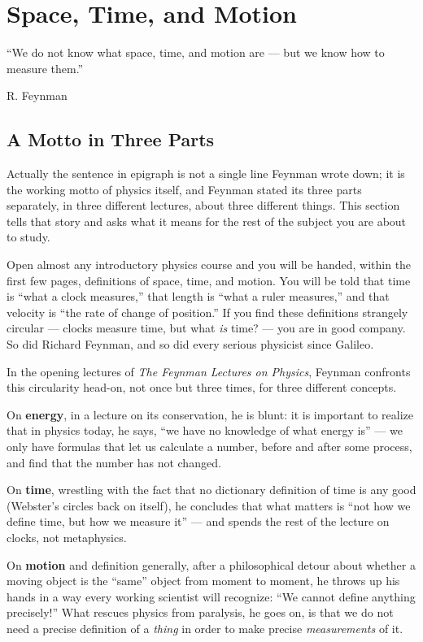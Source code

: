 \section{Space, Time, and Motion}

\epigraph{``We do not know what space, time, and motion are --- 
but we know how to measure them.''}{R. Feynman}

\subsection{A Motto in Three Parts}

Actually the sentence in epigraph  is not a single line Feynman wrote down; it
is the working motto of physics itself, and Feynman stated its three parts
separately, in three different lectures, about three different things. This
section tells that story and asks what it means for the rest of the subject you
are about to study.

Open almost any introductory physics course and you will be handed, within the
first few pages, definitions of space, time, and motion. You will be told that
time is ``what a clock measures,'' that length is ``what a ruler measures,''
and that velocity is ``the rate of change of position.'' If you find these
definitions strangely circular --- clocks measure time, but what \emph{is}
time? --- you are in good company. So did Richard Feynman, and so did every
serious physicist since Galileo.

In the opening lectures of \emph{The Feynman Lectures on Physics}, Feynman
confronts this circularity head-on, not once but three times, for three
different concepts.

On \textbf{energy}, in a lecture on its conservation, he is blunt: it is
important to realize that in physics today, he says, ``we have no knowledge of
what energy is'' --- we only have formulas that let us calculate a number,
before and after some process, and find that the number has not changed.

On \textbf{time}, wrestling with the fact that no dictionary definition of time
is any good (Webster's circles back on itself), he concludes that what matters
is ``not how we define time, but how we measure it'' --- and spends the rest of
the lecture on clocks, not metaphysics.

On \textbf{motion} and definition generally, after a philosophical detour about
whether a moving object is the ``same'' object from moment to moment, he throws
up his hands in a way every working scientist will recognize: ``We cannot
define anything precisely!'' What rescues physics from paralysis, he goes on,
is that we do not need a precise definition of a \emph{thing} in order to make
precise \emph{measurements} of it.

